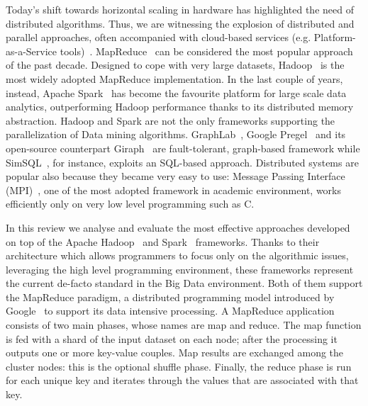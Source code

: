 

Today's shift towards horizontal scaling in hardware has highlighted the
need of distributed algorithms. Thus, we
are witnessing the explosion of distributed and parallel approaches, often
accompanied with cloud-based services (e.g. Platform-as-a-Service
tools)~\cite{ApilettiBCCG13}.
MapReduce~\cite{ArticoloMapReduceGoogle} can be considered the most popular
approach of the past decade. Designed to cope with very large datasets,
Hadoop~\cite{HDFS} is the most widely adopted MapReduce implementation.
In the last couple of years, instead, Apache Spark~\cite{Zaharia_spark}
has become the favourite platform for large scale data analytics,
outperforming Hadoop
performance thanks to its distributed memory abstraction. Hadoop and Spark are
not the only frameworks supporting the parallelization of Data mining
algorithms. GraphLab~\cite{graphlab}, Google Pregel~\cite{pregel} and its
open-source counterpart Giraph~\cite{giraph} are fault-tolerant, graph-based
framework while SimSQL~\cite{simsql}, for instance, exploits an SQL-based
approach. Distributed systems are popular also because they became very easy to
use: Message Passing Interface (MPI)~\cite{mpi}, one of the most adopted
framework in academic environment, works efficiently only on very low level
programming such as C.


In this review we analyse and evaluate the most effective approaches developed
on top of the Apache Hadoop~\cite{HDFS} and Spark~\cite{Zaharia_spark}
frameworks.
Thanks to their architecture which allows programmers to focus only on the
algorithmic issues,
leveraging the high level programming environment, these frameworks represent
the current de-facto standard in the Big Data environment.
Both of them support the MapReduce paradigm,
a distributed programming model introduced by
Google~\cite{ArticoloMapReduceGoogle}
to support its data intensive processing.
A MapReduce application consists of two main phases,
whose names are map and reduce. The map
function is fed with a shard of the input dataset on each node;
after the processing it outputs one or more key-value couples.
Map results are exchanged among the cluster nodes:
this is the optional shuffle phase.
Finally, the reduce phase is run for each unique key and iterates
through the values that are associated with that key.


